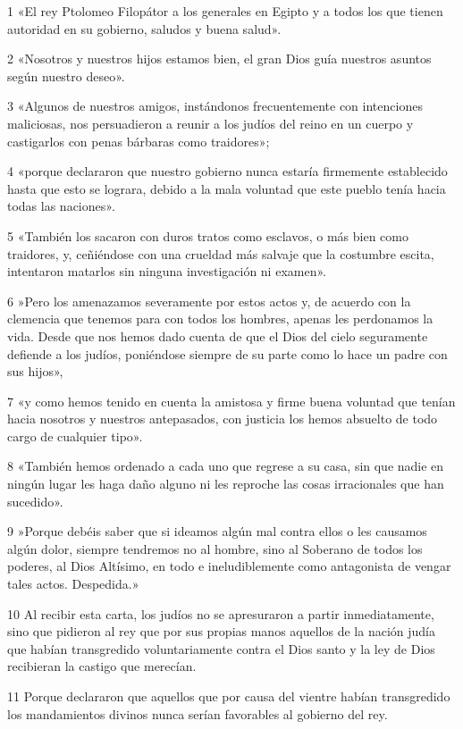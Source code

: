 \par 1 «El rey Ptolomeo Filopátor a los generales en Egipto y a todos los que tienen autoridad en su gobierno, saludos y buena salud».
\par 2 «Nosotros y nuestros hijos estamos bien, el gran Dios guía nuestros asuntos según nuestro deseo».
\par 3 «Algunos de nuestros amigos, instándonos frecuentemente con intenciones maliciosas, nos persuadieron a reunir a los judíos del reino en un cuerpo y castigarlos con penas bárbaras como traidores»;
\par 4 «porque declararon que nuestro gobierno nunca estaría firmemente establecido hasta que esto se lograra, debido a la mala voluntad que este pueblo tenía hacia todas las naciones».
\par 5 «También los sacaron con duros tratos como esclavos, o más bien como traidores, y, ceñiéndose con una crueldad más salvaje que la costumbre escita, intentaron matarlos sin ninguna investigación ni examen».
\par 6 »Pero los amenazamos severamente por estos actos y, de acuerdo con la clemencia que tenemos para con todos los hombres, apenas les perdonamos la vida. Desde que nos hemos dado cuenta de que el Dios del cielo seguramente defiende a los judíos, poniéndose siempre de su parte como lo hace un padre con sus hijos»,
\par 7 «y como hemos tenido en cuenta la amistosa y firme buena voluntad que tenían hacia nosotros y nuestros antepasados, con justicia los hemos absuelto de todo cargo de cualquier tipo».
\par 8 «También hemos ordenado a cada uno que regrese a su casa, sin que nadie en ningún lugar les haga daño alguno ni les reproche las cosas irracionales que han sucedido».
\par 9 »Porque debéis saber que si ideamos algún mal contra ellos o les causamos algún dolor, siempre tendremos no al hombre, sino al Soberano de todos los poderes, al Dios Altísimo, en todo e ineludiblemente como antagonista de vengar tales actos. Despedida.»
\par 10 Al recibir esta carta, los judíos no se apresuraron a partir inmediatamente, sino que pidieron al rey que por sus propias manos aquellos de la nación judía que habían transgredido voluntariamente contra el Dios santo y la ley de Dios recibieran la castigo que merecían.
\par 11 Porque declararon que aquellos que por causa del vientre habían transgredido los mandamientos divinos nunca serían favorables al gobierno del rey.
